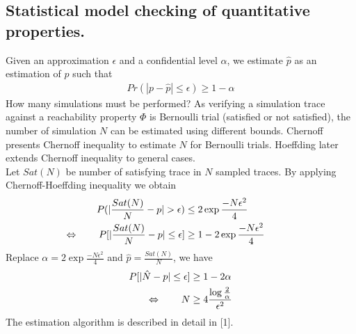 \subsection{Statistical model checking of quantitative properties.}
Given an approximation $\epsilon$ and a confidential
level $\alpha$, we estimate $\hat{p}$ as an estimation of $p$ such that
\begin{align*}
      Pr(|p-\hat{p}| \leq \epsilon) \geq 1 - \alpha
\end{align*}
How many simulations must be performed?  As verifying a simulation trace against a reachability
property $\Phi$ is Bernoulli trial (satisfied or not satisfied), the number of simulation $N$ can be
estimated using different bounds. Chernoff \cite{chernoff2014career} presents Chernoff inequality to
estimate $N$ for Bernoulli trials. Hoeffding \cite{hoeffding1963probability} later extends Chernoff
inequality to general cases.\\
Let $Sat(N)$ be number of satisfying trace in $N$ sampled traces. By applying Chernoff-Hoeffding
inequality we obtain
\begin{align*}
      P(|\frac{Sat(N)}{N}-p| > \epsilon)                                    & \leq 2\exp{\frac{-N\epsilon^2}{4}}     \\
      \llap{$\Leftrightarrow$ \qquad} P[|\frac{Sat(N)}{N}-p| \leq \epsilon] & \geq 1 - 2\exp{\frac{-N\epsilon^2}{4}}
\end{align*}
Replace $\alpha = 2\exp{\frac{-N\epsilon^2}{4}}$ and $\hat{p}=\frac{Sat(N)}{N}$, we have
\begin{align*}
      P[|\hat{N} - p| \leq \epsilon]    & \geq 1 - 2\alpha                                \\
      \llap{$\Leftrightarrow$ \qquad} N & \geq 4\frac{\log{\frac{2}{\alpha}}}{\epsilon^2}
\end{align*}
The estimation algorithm is described in detail in [1].
